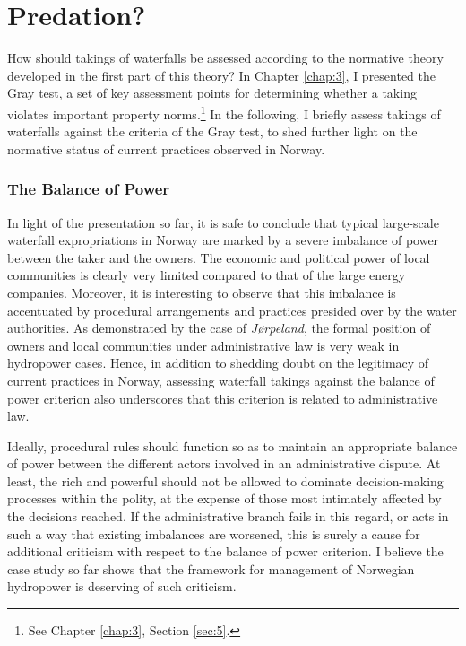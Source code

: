 \section{Predation?}\label{sec:5:7}

How should takings of waterfalls be assessed according to the normative theory developed in the first part of this theory? In Chapter \ref{chap:3}, I presented the Gray test, a set of key assessment points for determining whether a taking violates important property norms.\footnote{See Chapter \ref{chap:3}, Section \ref{sec:5}.} In the following, I briefly assess takings of waterfalls against the criteria of the Gray test, to shed further light on the normative status of current practices observed in Norway.

\subsubsection{The Balance of Power}\label{sec:5:7:1}

In light of the presentation so far, it is safe to conclude that typical large-scale waterfall expropriations in Norway are marked by a severe imbalance of power between the taker and the owners. The economic and political power of local communities is clearly very limited compared to that of the large energy companies. Moreover, it is interesting to observe that this imbalance is accentuated by procedural arrangements and practices presided over by the water authorities. As demonstrated by the case of {\it Jørpeland}, the formal position of owners and local communities under administrative law is very weak in hydropower cases. Hence, in addition to shedding doubt on the legitimacy of current practices in Norway, assessing waterfall takings against the balance of power criterion also underscores that this criterion is related to administrative law.

Ideally, procedural rules should function so as to maintain an appropriate balance of power between the different actors involved in an administrative dispute. At least, the rich and powerful should not be allowed to dominate decision-making processes within the polity, at the expense of those most intimately affected by the decisions reached. If the administrative branch fails in this regard, or acts in such a way that existing imbalances are worsened, this is surely a cause for additional criticism with respect to the balance of power criterion. I believe the case study so far shows that the framework for management of Norwegian hydropower is deserving of such criticism.

